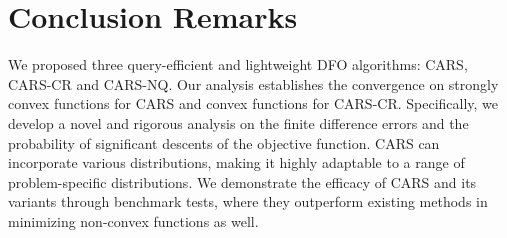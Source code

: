 \label{Chapter: CARS}
















\section{Conclusion Remarks} \label{sec:conclusion}
We proposed three query-efficient and lightweight DFO algorithms: CARS, CARS-CR and CARS-NQ. Our analysis establishes the convergence on strongly convex functions for CARS and convex functions for CARS-CR. Specifically, we develop a novel and rigorous analysis on the finite difference errors and the probability of significant descents of the objective function. CARS can incorporate various distributions, making it highly adaptable to a range of problem-specific distributions. We demonstrate the efficacy of CARS and its variants through benchmark tests, where they outperform existing methods in minimizing non-convex functions as well.